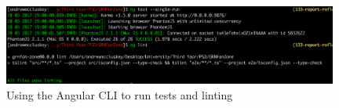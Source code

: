 \begin{figure}
\begin{center}
\includegraphics[width=11cm]{figures/frontend_ng_cli}
\end{center}
\caption{Using the Angular CLI to run tests and linting}
\label{fig:frontend_ng_cli}
\end{figure}